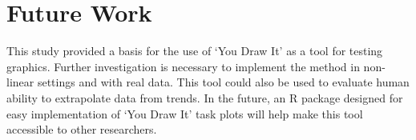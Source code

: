 \documentclass[12pt]{article}
\begin{document}
\hypertarget{future-work}{%
\section{Future Work}\label{future-work}}

This study provided a basis for the use of `You Draw It' as a tool for
testing graphics. Further investigation is necessary to implement the
method in non-linear settings and with real data. This tool could also
be used to evaluate human ability to extrapolate data from trends. In
the future, an R package designed for easy implementation of `You Draw
It' task plots will help make this tool accessible to other researchers.



\end{document}
